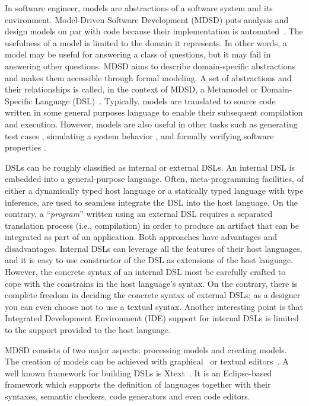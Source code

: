In software engineer, models are abstractions of a software system and its environment.
Model-Driven Software Development (MDSD) puts analysis and design models on par with
code because their implementation is automated~\cite{Stahl:2006:MSD:1196766, Fowler:2010:DSL:1809745}.
The usefulness of a model is limited to the domain it represents.
In other words, a model may be useful for answering a class of questions, but it may fail in answering other questions.
MDSD aims to describe domain-specific abstractions and makes them accessible through formal modeling.
A set of abstractions and their relationships is called, in the context of MDSD, a Metamodel or Domain-Specific Language (DSL)~\cite{Fowler:2010:DSL:1809745}.
Typically, models are translated to source code written in some general purposes language to enable their subsequent compilation and execution.
However, models are also useful in other tasks such as generating test cases \cite{Kiffe2009,Gutierrez2015}, simulating a system behavior \cite{Broenink2012,brosig2015a,Bocciarelli2015425}, and formally verifying software properties \cite{Holzmann2004,Henriksson2005101,Moffett2013,DiGuglielmo20132013}. 

DSLs can be roughly classified as internal or external DSLs.
An internal DSL is embedded into a general-purpose language.
Often, meta-programming facilities, of either a dynamically typed host language or a statically typed language with type inference, are used to seamless integrate the DSL into the host language.
On the contrary, a ``\textit{program}'' written using an external DSL requires a separated translation process (i.e., compilation) in order to produce an artifact that can be integrated as part of an application.
Both approaches have advantages and disadvantages.
Internal DSLs can leverage all the features of their host languages, and it is easy to use constructor of the DSL as extensions of the host language.
However, the concrete syntax of an internal DSL most be carefully crafted to cope with the constrains in the host language's syntax.
On the contrary, there is complete freedom in deciding the concrete syntax of external DSLs; as a designer you can even choose not to use a textual syntax.
Another interesting point is that Integrated Development Environment (IDE) support for internal DSLs is limited to the support provided to the host language.


MDSD consists of two major aspects: processing models and creating models.
The creation of models can be achieved with graphical~\cite{Kolovos:2009:RLA:1564600.1564699, Biermann:2006:GDI:2087202.2087244} or textual editors~\cite{Merkle:2010:TMT:1869542.1869564}.
A well known framework for building DSLs is Xtext~\cite{Eysholdt:2010:XIY:1869542.1869625}.
It is an Eclipse-based framework which supports the definition of languages together with their syntaxes, semantic checkers, code generators and even code editors.

